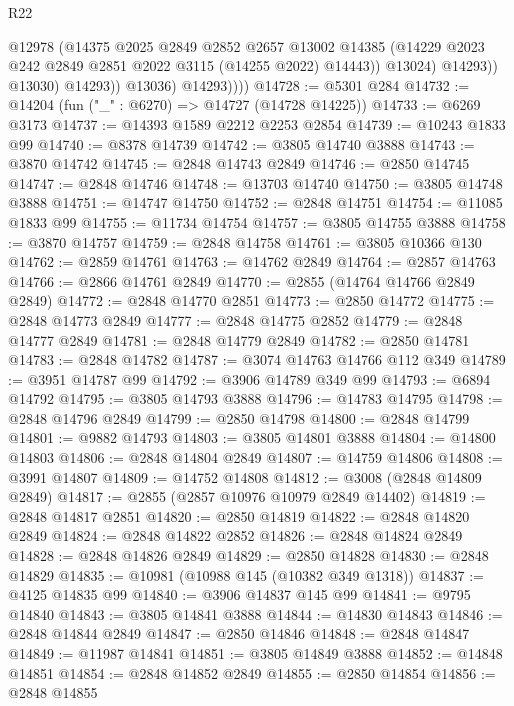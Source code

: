 \begin{lexlean}{R22}
\begin{coremodule}
                          @12978
                          (@14375
                            @2025
                            @2849
                            @2852
                            @2657
                            @13002
                            @14385
                            (@14229 @2023 @242 @2849 @2851 @2022 @3115 (@14255 @2022) @14443))
                          @13024)
                        @14293))
                    @13030)
                  @14293))
              @13036)
            @14293))))
@14728 := @5301 @284
@14732 := @14204 (fun ("_" : @6270) => @14727 (@14728 @14225))
@14733 := @6269 @3173
@14737 := @14393 @1589 @2212 @2253 @2854
@14739 := @10243 @1833 @99
@14740 := @8378 @14739
@14742 := @3805 @14740 @3888
@14743 := @3870 @14742
@14745 := @2848 @14743 @2849
@14746 := @2850 @14745
@14747 := @2848 @14746
@14748 := @13703 @14740
@14750 := @3805 @14748 @3888
@14751 := @14747 @14750
@14752 := @2848 @14751
@14754 := @11085 @1833 @99
@14755 := @11734 @14754
@14757 := @3805 @14755 @3888
@14758 := @3870 @14757
@14759 := @2848 @14758
@14761 := @3805 @10366 @130
@14762 := @2859 @14761
@14763 := @14762 @2849
@14764 := @2857 @14763
@14766 := @2866 @14761 @2849
@14770 := @2855 (@14764 @14766 @2849 @2849)
@14772 := @2848 @14770 @2851
@14773 := @2850 @14772
@14775 := @2848 @14773 @2849
@14777 := @2848 @14775 @2852
@14779 := @2848 @14777 @2849
@14781 := @2848 @14779 @2849
@14782 := @2850 @14781
@14783 := @2848 @14782
@14787 := @3074 @14763 @14766 @112 @349
@14789 := @3951 @14787 @99
@14792 := @3906 @14789 @349 @99
@14793 := @6894 @14792
@14795 := @3805 @14793 @3888
@14796 := @14783 @14795
@14798 := @2848 @14796 @2849
@14799 := @2850 @14798
@14800 := @2848 @14799
@14801 := @9882 @14793
@14803 := @3805 @14801 @3888
@14804 := @14800 @14803
@14806 := @2848 @14804 @2849
@14807 := @14759 @14806
@14808 := @3991 @14807
@14809 := @14752 @14808
@14812 := @3008 (@2848 @14809 @2849)
@14817 := @2855 (@2857 @10976 @10979 @2849 @14402)
@14819 := @2848 @14817 @2851
@14820 := @2850 @14819
@14822 := @2848 @14820 @2849
@14824 := @2848 @14822 @2852
@14826 := @2848 @14824 @2849
@14828 := @2848 @14826 @2849
@14829 := @2850 @14828
@14830 := @2848 @14829
@14835 := @10981 (@10988 @145 (@10382 @349 @1318))
@14837 := @4125 @14835 @99
@14840 := @3906 @14837 @145 @99
@14841 := @9795 @14840
@14843 := @3805 @14841 @3888
@14844 := @14830 @14843
@14846 := @2848 @14844 @2849
@14847 := @2850 @14846
@14848 := @2848 @14847
@14849 := @11987 @14841
@14851 := @3805 @14849 @3888
@14852 := @14848 @14851
@14854 := @2848 @14852 @2849
@14855 := @2850 @14854
@14856 := @2848 @14855

\end{coremodule}
\end{lexlean}
